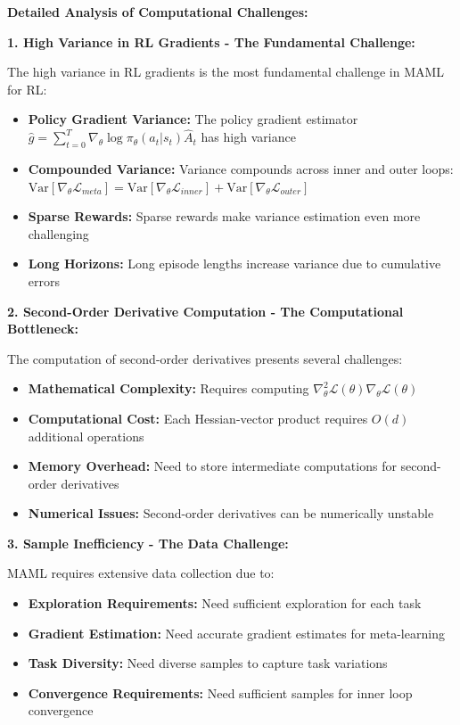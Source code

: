 \documentclass[12pt]{article}
\newcommand{\ieee}[1]{\textcolor{IEEEBlue}{\textbf{#1}}}
\begin{document}
{{			\ieee{Detailed Analysis of Computational Challenges:}
			
			\textbf{1. High Variance in RL Gradients - The Fundamental Challenge:}
			
			The high variance in RL gradients is the most fundamental challenge in MAML for RL:
			
			\begin{itemize}
				\item \textbf{Policy Gradient Variance:} The policy gradient estimator $\hat{g} = \sum_{t=0}^T \nabla_\theta \log \pi_\theta(a_t|s_t) \hat{A}_t$ has high variance
				\item \textbf{Compounded Variance:} Variance compounds across inner and outer loops: $\text{Var}[\nabla_\theta \mathcal{L}_{meta}] = \text{Var}[\nabla_\theta \mathcal{L}_{inner}] + \text{Var}[\nabla_\theta \mathcal{L}_{outer}]$
				\item \textbf{Sparse Rewards:} Sparse rewards make variance estimation even more challenging
				\item \textbf{Long Horizons:} Long episode lengths increase variance due to cumulative errors
			\end{itemize}
			
			\textbf{2. Second-Order Derivative Computation - The Computational Bottleneck:}
			
			The computation of second-order derivatives presents several challenges:
			
			\begin{itemize}
				\item \textbf{Mathematical Complexity:} Requires computing $\nabla^2_\theta \mathcal{L}(\theta) \nabla_\theta \mathcal{L}(\theta)$
				\item \textbf{Computational Cost:} Each Hessian-vector product requires $O(d)$ additional operations
				\item \textbf{Memory Overhead:} Need to store intermediate computations for second-order derivatives
				\item \textbf{Numerical Issues:} Second-order derivatives can be numerically unstable
			\end{itemize}
			
			\textbf{3. Sample Inefficiency - The Data Challenge:}
			
			MAML requires extensive data collection due to:
			
			\begin{itemize}
				\item \textbf{Exploration Requirements:} Need sufficient exploration for each task
				\item \textbf{Gradient Estimation:} Need accurate gradient estimates for meta-learning
				\item \textbf{Task Diversity:} Need diverse samples to capture task variations
				\item \textbf{Convergence Requirements:} Need sufficient samples for inner loop convergence
			\end{itemize}
			
}}
\end{document}
